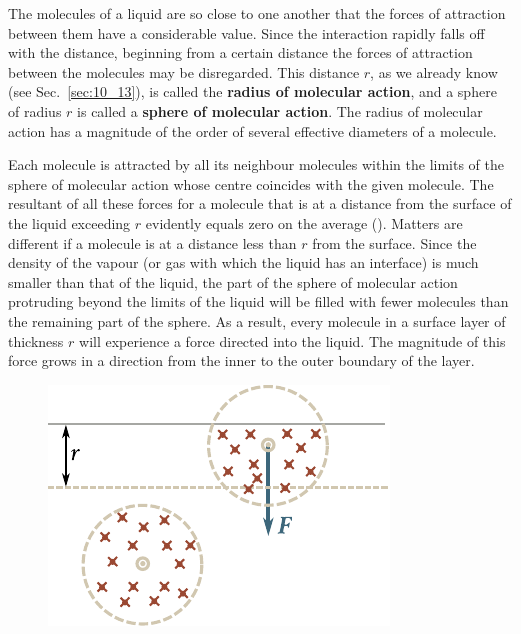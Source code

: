 The molecules of a liquid are so close to one another that the forces of attraction between them have a considerable value. Since the interaction rapidly falls off with the distance, beginning from a certain distance the forces of attraction between the molecules may be disregarded. This distance $r$, as we already know (see Sec.~\ref{sec:10_13}), is called the \textbf{radius of molecular action}, and a sphere of radius $r$ is called a \textbf{sphere of molecular action}. The radius of molecular action has a magnitude of the order of several effective diameters of a molecule.

Each molecule is attracted by all its neighbour molecules within the limits of the sphere of molecular action whose centre coincides with the given molecule. The resultant of all these forces for a molecule that is at a distance from the surface of the liquid exceeding $r$ evidently equals zero on the average (). Matters are different if a molecule is at a distance less than $r$ from the surface. Since the density of the vapour (or gas with which the liquid has an interface) is much smaller than that of the liquid, the part of the sphere of molecular action protruding beyond the limits of the liquid will be filled with fewer molecules than the remaining part of the sphere. As a result, every molecule in a surface layer of thickness $r$ will experience a force directed into the liquid. The magnitude of this force grows in a direction from the inner to the outer boundary of the layer.

\begin{figure}[t]
	\begin{center}
		\includegraphics[scale=1.1]{figures/ch_14/fig_14_1.pdf}
		\caption[]{}
		\label{fig:14_1}
	\end{center}
	\vspace{-0.8cm}
\end{figure}

